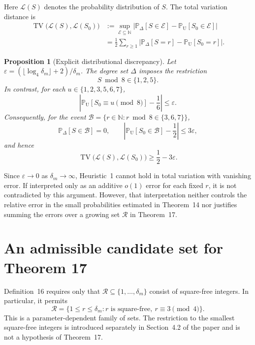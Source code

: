 \documentclass[a4paper,11pt]{article}
\newtheorem{proposition}{Proposition}
\theoremstyle{remark}
\DeclareMathOperator{\TV}{TV}
\newcommand{\Rset}{\mathcal R}
\newcommand{\PrD}{\mathbb P_{\Delta}}
\newcommand{\PrU}{\mathbb P_{\mathrm U}}
\newcommand{\N}{\mathbb N}
\begin{document}
Here $\mathcal L(S)$ denotes the probability distribution of $S$.
The total variation distance is
\begin{align*}
 \TV\bigl(\mathcal L(S),\mathcal L(S_0)\bigr)
 &:=\sup_{\mathcal E\subseteq\N}
       |\PrD[S\in\mathcal E]-\PrU[S_0\in\mathcal E]|\\
 &=\frac12\sum_{r\ge1}|\PrD[S=r]-\PrU[S_0=r]|.
\end{align*}

\begin{proposition}[Explicit distributional discrepancy]\label{prop:gap}
Let $\varepsilon=(\lfloor\log_4\delta_m\rfloor+2)/\delta_m$.
The degree set $\Delta$ imposes the restriction
\[
 S\bmod8\in\{1,2,5\}.
\]
In contrast, for each $u\in\{1,2,3,5,6,7\}$,
\[
 \left|\PrU[S_0\equiv u\pmod8]-\frac16\right|
 \le\varepsilon.
\]
Consequently, for the event
$\mathcal B=\{r\in\N:r\bmod8\in\{3,6,7\}\}$,
\begin{equation}\label{eq:forbidden}
 \PrD[S\in\mathcal B]=0,
 \qquad
 \left|\PrU[S_0\in\mathcal B]-\frac12\right|\le3\varepsilon,
\end{equation}
and hence
\begin{equation}\label{eq:TV}
 \TV\bigl(\mathcal L(S),\mathcal L(S_0)\bigr)
 \ge\frac12-3\varepsilon.
\end{equation}
\end{proposition}

Since $\varepsilon\to0$ as $\delta_m\to\infty$, Heuristic~1 cannot hold
in total variation with vanishing error. If interpreted only as an additive $o(1)$
error for each fixed $r$, it is not contradicted by this argument.
However, that interpretation neither controls the relative error in the
small probabilities estimated in Theorem~14 nor justifies summing the
errors over a growing set $\Rset$ in Theorem~17.

\section{An admissible candidate set for Theorem 17}

Definition~16 requires only that $\Rset\subseteq\{1,\ldots,\delta_m\}$
consist of square-free integers. In particular, it permits
\begin{equation}\label{eq:R}
 \Rset=\{1\le r\le\delta_m:r\text{ is square-free},\
                                  r\equiv3\pmod4\}.
\end{equation}
This is a parameter-dependent family of sets. The restriction to the
smallest square-free integers is introduced separately in Section~4.2 of
the paper and is not a hypothesis of Theorem~17.
\end{document}
